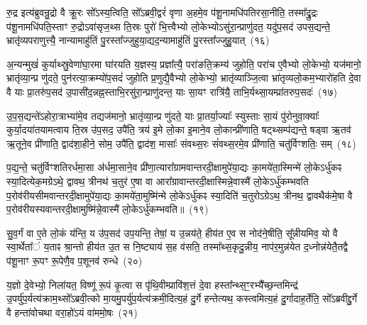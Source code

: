 रु॒द्र इत्य॑ब्रुवन्रु॒द्रो वै क्रू॒रः सो᳚\-ऽस्य॒त्विति॒ सो᳚\-ऽब्रवी॒द्वरं॑ वृणा अ॒हमे॒व प॑शू॒नामधि॑पतिरसा॒नीति॒ तस्मा᳚द्रु॒द्रः प॑शू॒नामधि॑पति॒स्ताꣳ रु॒द्रो\-ऽवा॑सृज॒थ्स ति॒स्रः पुरो॑ भि॒त्त्वैभ्यो लो॒केभ्यो\-ऽसु॑रा॒न्प्राणु॑दत॒ यदु॑प॒सद॑ उपस॒द्यन्ते॒ भ्रातृ॑व्यपराणुत्त्यै॒ नान्यामाहु॑तिं पु॒रस्ता᳚ज्जुहुया॒द्यद॒न्यामाहु॑तिं पु॒रस्ता᳚ज्जुहु॒यात्~(१६)

अ॒न्यन्मुखं॑ कुर्याथ्स्रु॒वेणा॑घा॒रमा घा॑रयति य॒ज्ञस्य॒ प्रज्ञा᳚त्यै॒ परा॑ङति॒क्रम्य॑ जुहोति॒ परा॑च ए॒वैभ्यो लो॒केभ्यो॒ यज॑मानो॒ भ्रातृ॑व्या॒न्प्र णु॑दते॒ पुन॑रत्या॒क्रम्यो॑प॒सदं॑ जुहोति प्र॒णुद्यै॒वैभ्यो लो॒केभ्यो॒ भ्रातृ॑व्याञ्जि॒त्वा भ्रा॑तृव्यलो॒कम॒भ्यारो॑हति दे॒वा वै याः प्रा॒तरु॑प॒सद॑ उ॒पासी॑द॒न्नह्न॒स्ताभि॒रसु॑रा॒न्प्राणु॑दन्त॒ याः सा॒यꣳ रात्रि॑यै॒ ताभि॒र्यथ्सा॒यम्प्रा॑तरुप॒सदः॑~(१७)

उ॒प॒स॒द्यन्ते॑\-ऽहोरा॒त्राभ्या॑मे॒व तद्यज॑मानो॒ भ्रातृ॑व्या॒न्प्र णु॑दते॒ याः प्रा॒तर्या॒ज्याः᳚ स्युस्ताः सा॒यं पु॑रोनुवा॒क्याः᳚ कुर्या॒दया॑तयामत्वाय ति॒स्र उ॑प॒सद॒ उपै॑ति॒ त्रय॑ इ॒मे लो॒का इ॒माने॒व लो॒कान्प्री॑णाति॒ षट्थ्सम्प॑द्यन्ते॒ षड्वा ऋ॒तव॑ ऋ॒तूने॒व प्री॑णाति॒ द्वाद॑शा॒हीने॒ सोम॒ उपै॑ति॒ द्वाद॑श॒ मासाः᳚ संवथ्स॒रः सं॑वथ्स॒रमे॒व प्री॑णाति॒ चतु॑र्विꣳशतिः॒ सम्~(१८)

प॒द्य॒न्ते॒ चतु॑र्विꣳशतिरर्धमा॒सा अ॑र्धमा॒साने॒व प्री॑णा॒त्यारा᳚ग्रामवान्तरदी॒क्षामुपे॑या॒द्यः का॒मये॑ता॒स्मिन्मे॑ लो॒के\-ऽर्धु॑कꣴ स्या॒दित्येक॒मग्रे\-ऽथे॒ द्वावथ॒ त्रीनथ॑ च॒तुर॑ ए॒षा वा आरा᳚ग्रावान्तरदी॒क्षास्मिन्ने॒वास्मै॑ लो॒के\-ऽर्धु॑कम्भवति प॒रोव॑रीयसीमवान्तरदी॒क्षामुपे॑या॒द्यः का॒मये॑ता॒मुष्मि॑न्मे लो॒के\-ऽर्धु॑कꣴ स्या॒दिति॑ च॒तुरो\-ऽग्रे\-ऽथ॒ त्रीनथ॒ द्वावथैक॑मे॒षा वै प॒रोव॑रीयस्यवान्तरदी॒क्षामुष्मि॑न्ने॒वास्मै॑ लो॒के\-ऽर्धु॑कम्भवति॥~(१९)

{\anuvakamend[{अ॒सि॒ष्य॒तीति॑ जुहु॒याथ्सा॒यम्प्रा॑तरुप॒सद॒श्चतु॑र्विꣳशतिः॒ सञ्च॒तुरो\-ऽग्रे॒ षोड॑श च}]}%

सु॒व॒र्गं वा ए॒ते लो॒कं य॑न्ति॒ य उ॑प॒सद॑ उप॒यन्ति॒ तेषां॒ य उ॒न्नय॑ते॒ हीय॑त ए॒व स नोद॑ने॒षीति॒ सू᳚न्नीयमिव॒ यो वै स्वा॒र्थेता᳚ं य॒ताꣴ श्रा॒न्तो हीय॑त उ॒त स नि॒ष्ट्याय॑ स॒ह व॑सति॒ तस्मा᳚थ्स॒कृदु॒न्नीय॒ नाप॑र॒मुन्न॑येत द॒ध्नोन्न॑येतै॒तद्वै प॑शू॒नाꣳ रू॒पꣳ रू॒पेणै॒व प॒शूनव॑ रुन्धे~(२०)

य॒ज्ञो दे॒वेभ्यो॒ निला॑यत॒ विष्णू॑ रू॒पं कृ॒त्वा स पृ॑थि॒वीम्प्रावि॑श॒त्तं दे॒वा हस्ता᳚न्थ्स॒ꣳ॒रभ्यै᳚च्छ॒न्तमिन्द्र॑ उ॒पर्यु॑प॒र्यत्य॑क्राम॒थ्सो᳚\-ऽब्रवी॒त्को मा॒यमु॒पर्यु॑प॒र्यत्य॑क्रमी॒दित्य॒हं दु॒र्गे हन्तेत्यथ॒ कस्त्वमित्य॒हं दु॒र्गादाह॒र्तेति॒ सो᳚\-ऽब्रवीद्दु॒र्गे वै हन्ता॑वोचथा वरा॒हो॑\-ऽयं वा॑ममो॒षः~(२१)

